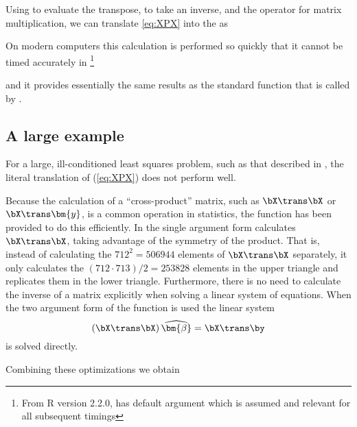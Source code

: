 \Rcodeplaceholder{}

Using  to evaluate
the transpose,  to take an inverse, and the \code{\%*\%}
operator for matrix multiplication, we can translate \ref{eq:XPX} into
the \Slang{} as

\Rcodeplaceholder{}

On modern computers this calculation is performed so quickly that it cannot
be timed accurately in \RR{}
\footnote{From R version 2.2.0,  has default argument
   which is assumed and relevant for all subsequent timings}

\Rcodeplaceholder{}

and it provides essentially the same results as the standard
 function that is called by .

\Rcodeplaceholder{}


\subsection{A large example}
\label{sec:largeLSQ}

For a large, ill-conditioned least squares problem, such as that
described in \citet{koen:ng:2003}, the literal translation of
(\ref{eq:XPX}) does not perform well.

\Rcodeplaceholder{}

Because the calculation of a ``cross-product'' matrix, such as
$\bX\trans\bX$ or $\bX\trans\bm{y}$, is a common operation in
statistics, the  function has been provided to do
this efficiently.  In the single argument form 
calculates $\bX\trans\bX$, taking advantage of the symmetry of the
product.  That is, instead of calculating the $712^2=506944$ elements of
$\bX\trans\bX$ separately, it only calculates the $(712\cdot
713)/2=253828$ elements in the upper triangle and replicates them in
the lower triangle. Furthermore, there is no need to calculate the
inverse of a matrix explicitly when solving a
linear system of equations.  When the two argument form of the 
function is used the linear system
\begin{equation}
  \label{eq:LSQsol}
  \left(\bX\trans\bX\right) \widehat{\bm{\beta}} = \bX\trans\by
\end{equation}
is solved directly.

Combining these optimizations we obtain

\Rcodeplaceholder{}

